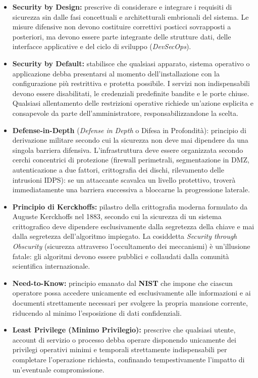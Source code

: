 \documentclass[../../main.tex]{subfiles}
\begin{document}
\begin{itemize}
    \item \textbf{Security by Design:} prescrive di considerare e integrare i requisiti di sicurezza sin dalle fasi concettuali e architetturali embrionali del sistema. Le misure difensive non devono costituire correttivi posticci sovrapposti a posteriori, ma devono essere parte integrante delle strutture dati, delle interfacce applicative e del ciclo di sviluppo (\textit{DevSecOps}).
    \item \textbf{Security by Default:} stabilisce che qualsiasi apparato, sistema operativo o applicazione debba presentarsi al momento dell'installazione con la configurazione più restrittiva e protetta possibile. I servizi non indispensabili devono essere disabilitati, le credenziali predefinite bandite e le porte chiuse. Qualsiasi allentamento delle restrizioni operative richiede un'azione esplicita e consapevole da parte dell'amministratore, responsabilizzandone la scelta.
    \item \textbf{Defense-in-Depth} (\textit{Defense in Depth} o Difesa in Profondità): principio di derivazione militare secondo cui la sicurezza non deve mai dipendere da una singola barriera difensiva. L'infrastruttura deve essere organizzata secondo cerchi concentrici di protezione (firewall perimetrali, segmentazione in DMZ, autenticazione a due fattori, crittografia dei dischi, rilevamento delle intrusioni IDPS): se un attaccante scavalca un livello protettivo, troverà immediatamente una barriera successiva a bloccarne la progressione laterale.
    \item \textbf{Principio di Kerckhoffs:} pilastro della crittografia moderna formulato da Auguste Kerckhoffs nel 1883, secondo cui la sicurezza di un sistema crittografico deve dipendere esclusivamente dalla segretezza della chiave e mai dalla segretezza dell'algoritmo impiegato. La cosiddetta \textit{Security through Obscurity} (sicurezza attraverso l'occultamento dei meccanismi) è un'illusione fatale: gli algoritmi devono essere pubblici e collaudati dalla comunità scientifica internazionale.
    \item \textbf{Need-to-Know:} principio emanato dal \textbf{NIST} che impone che ciascun operatore possa accedere unicamente ed esclusivamente alle informazioni e ai documenti strettamente necessari per svolgere la propria mansione corrente, riducendo al minimo l'esposizione di dati confidenziali.
    \item \textbf{Least Privilege (Minimo Privilegio):} prescrive che qualsiasi utente, account di servizio o processo debba operare disponendo unicamente dei privilegi operativi minimi e temporali strettamente indispensabili per completare l'operazione richiesta, confinando tempestivamente l'impatto di un'eventuale compromissione.
\end{itemize}
\end{document}
